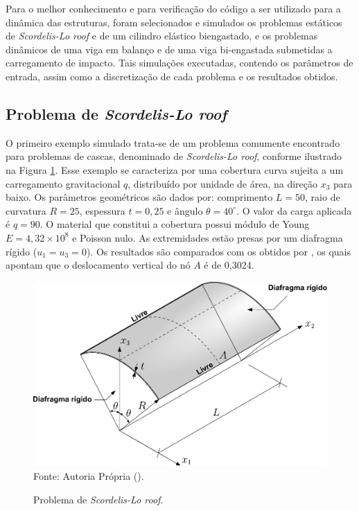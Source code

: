 Para o melhor conhecimento e para verificação do código a ser utilizado para a dinâmica das estruturas, foram selecionados e simulados os problemas estáticos de \textit{Scordelis-Lo roof} e de um cilindro elástico biengastado, e os problemas dinâmicos de uma viga em balanço e de uma viga bi-engastada submetidas a carregamento de impacto. Tais simulações executadas, contendo os parâmetros de entrada, assim como a discretização de cada problema e os resultados obtidos.

\subsection{Problema de \textit{Scordelis-Lo roof}} \label{Ap:SLR}

O primeiro exemplo simulado trata-se de um problema comumente encontrado para problemas de cascas, denominado de \textit{Scordelis-Lo roof}, conforme ilustrado na Figura \ref{fig:scordelis}. Esse exemplo se caracteriza por uma cobertura curva sujeita a um carregamento gravitacional $q$, distribuído por unidade de área, na direção $x_3$ para baixo. Os parâmetros geométricos são dados por: comprimento $L=50$, raio de curvatura $R=25$, espessura $t=0,25$ e ângulo $\theta=40^\circ$. O valor da carga aplicada é $q=90$. O material que constitui a cobertura possui módulo de Young $E=4,32\times10^8$ e Poisson nulo. As extremidades estão presas por um diafragma rígido ($u_1=u_3=0$). Os resultados são comparados com os obtidos por , os quais apontam que o deslocamento vertical do nó $A$ é de 0,3024.

\begin{figure}[h!]
    \centering
    \caption{Problema de \textit{Scordelis-Lo roof}.}
    \includegraphics[width=0.75\linewidth]{Figuras/scordelis/scordelis_lo.pdf}
    \\Fonte: Autoria Própria (\the\year).
    \label{fig:scordelis}
\end{figure}

